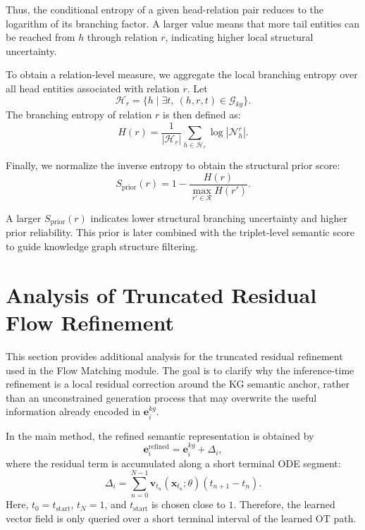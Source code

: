 Thus, the conditional entropy of a given head-relation pair reduces to the logarithm of its branching factor. A larger value means that more tail entities can be reached from \(h\) through relation \(r\), indicating higher local structural uncertainty.

To obtain a relation-level measure, we aggregate the local branching entropy over all head entities associated with relation \(r\). Let
\begin{equation}
\label{eq:app_head_set}
\mathcal{H}_{r}
=
\{h \mid \exists t,\ (h,r,t)\in \mathcal{G}_{kg}\}.
\end{equation}
The branching entropy of relation \(r\) is then defined as:
\begin{equation}
\label{eq:app_relation_branching_entropy}
H(r)
=
\frac{1}{|\mathcal{H}_{r}|}
\sum_{h\in \mathcal{H}_{r}}
\log |\mathcal{N}_{h}^{r}|.
\end{equation}

Finally, we normalize the inverse entropy to obtain the structural prior score:
\begin{equation}
\label{eq:app_relation_entropy_prior}
S_{\mathrm{prior}}(r)
=
1-\frac{H(r)}{\max_{r'\in\mathcal{R}}H(r')}.
\end{equation}

A larger \(S_{\mathrm{prior}}(r)\) indicates lower structural branching uncertainty and higher prior reliability. This prior is later combined with the triplet-level semantic score to guide knowledge graph structure filtering.

\section{Analysis of Truncated Residual Flow Refinement}
\label{app:flow_refinement_analysis}

This section provides additional analysis for the truncated residual refinement used in the Flow Matching module. The goal is to clarify why the inference-time refinement is a local residual correction around the KG semantic anchor, rather than an unconstrained generation process that may overwrite the useful information already encoded in \(\mathbf{e}_i^{kg}\).

In the main method, the refined semantic representation is obtained by
\begin{equation}
	\label{eq:app_flow_residual}
	\mathbf{e}_i^{\mathrm{refined}}
	=
	\mathbf{e}_i^{kg}
	+
	\Delta_i,
\end{equation}
where the residual term is accumulated along a short terminal ODE segment:
\begin{equation}
	\label{eq:app_flow_delta}
	\Delta_i
	=
	\sum_{n=0}^{N-1}
	\mathbf{v}_{t_n}(\mathbf{x}_{t_n};\theta)
	(t_{n+1}-t_n).
\end{equation}
Here, \(t_0=t_{\mathrm{start}}\), \(t_N=1\), and \(t_{\mathrm{start}}\) is chosen close to \(1\). Therefore, the learned vector field is only queried over a short terminal interval of the learned OT path.

